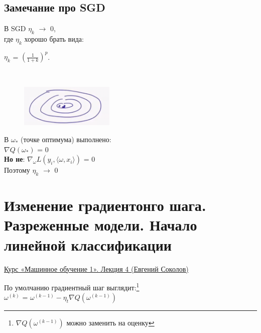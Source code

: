 


    \subsection{Замечание про SGD}

        В SGD $\eta_k$ $\longrightarrow$ $0$,\\
 
        где $\eta_k$ хорошо брать вида:
        \begin{center}
            $\eta_k$ = $(\frac{1}{1 + k})^p$.
        \end{center}
        \\
        \begin{figure}[H]
            \centering
            \includegraphics[width=0.4\textwidth]{images/3lecture/SGD_note.png}
         \end{figure}

         В $\omega_*$ (точке оптимума) выполнено:\\

         $\nabla Q(\omega_*)$ = $0$\\

         \textbf{Но не}: $\nabla_\omega L(y_i, \langle \omega, x_i\rangle)$ = $0$\\

         Поэтому $\eta_k$ $\longrightarrow$ $0$
        
                    

\newpage
\section{Изменение градиентонго шага. Разреженные модели. Начало линейной классификации}

    \href{https://www.youtube.com/watch?v=zvJyURwYCVo}{Курс «Машинное обучение 1». Лекция 4 (Евгений Соколов)}

    \begin{center}
        По умолчанию градиентный шаг выглядит:\footnote{$\nabla Q(\omega^{(k - 1)})$ можно заменить на оценку}\\
        \Large{$\omega^{(k)}$ = $\omega^{(k - 1)} - \eta_t\nabla Q(\omega^{(k - 1)})$}
    \end{center}

